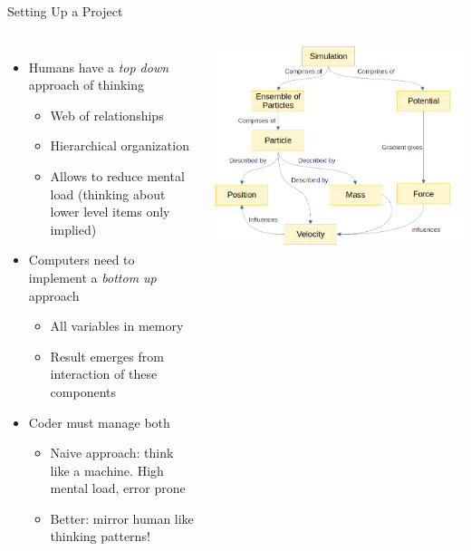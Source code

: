 \begin{frame}{Setting Up a Project}
%
\begin{columns}
\begin{itemize}
\item Humans have a \emph{top down} approach of thinking
	\begin{itemize}
	\item Web of relationships
	\item Hierarchical organization
	\item Allows to reduce mental load (thinking about lower level items only implied)
	\end{itemize}
\item Computers need to implement a \emph{bottom up} approach
	\begin{itemize}
	\item All variables in memory
	\item Result emerges from interaction of these components
	\end{itemize}
\item Coder must manage both
	\begin{itemize}
	\item Naive approach: think like a machine. High mental load, error prone
	\item Better: mirror human like thinking patterns!
	\end{itemize}
\end{itemize}
%
\includegraphics[width=\linewidth]{./gfx/01-structure}
\end{columns}
%
\end{frame}

